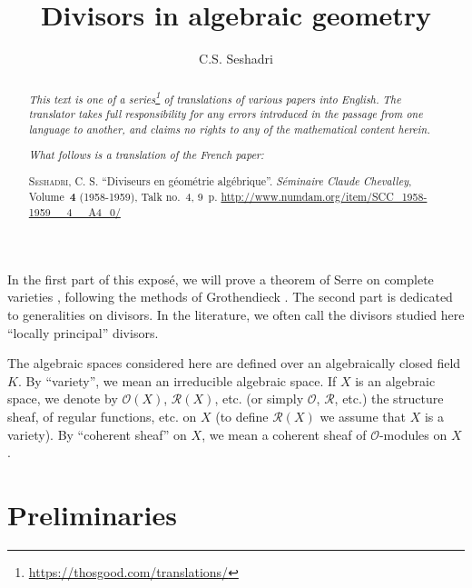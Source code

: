\documentclass{article}
\title{Divisors in algebraic geometry}
\author{C.S. Seshadri}
\date{}
\theoremstyle{plain}
\theoremstyle{definition}
\newcommand{\sh}{\mathscr}
\newcommand{\oldpage}[1]{\marginpar{\footnotesize$\Big\vert$ \textit{p.~#1}}}
\begin{document}
\maketitle
\thispagestyle{fancy}

\renewcommand{\abstractname}{Translator's note.}

\begin{abstract}
  \renewcommand*{\thefootnote}{\fnsymbol{footnote}}
  \emph{This text is one of a series\footnote{\url{https://thosgood.com/translations/}} of translations of various papers into English.}
  \emph{The translator takes full responsibility for any errors introduced in the passage from one language to another, and claims no rights to any of the mathematical content herein.}
  
  \emph{What follows is a translation of the French paper:}

  \medskip\noindent
  \textsc{Seshadri, C. S.}
  ``Diviseurs en g\'{e}om\'{e}trie alg\'{e}brique''.
  \emph{S\'{e}minaire Claude Chevalley}, Volume~\textbf{4} (1958-1959), Talk no.~4, 9~p.
  {\footnotesize\url{http://www.numdam.org/item/SCC_1958-1959__4__A4_0/}}
\end{abstract}

\setcounter{footnote}{0}

\tableofcontents
\bigskip



\oldpage{4-01}
In the first part of this expos\'{e}, we will prove a theorem of Serre on complete varieties \cite{6}, following the methods of Grothendieck \cite{4}.
The second part is dedicated to generalities on divisors.
In the literature, we often call the divisors studied here ``locally principal'' divisors.

The algebraic spaces considered here are defined over an algebraically closed field $K$.
By ``variety'', we mean an irreducible algebraic space.
If $X$ is an algebraic space, we denote by $\sh{O}(X)$, $\sh{R}(X)$, etc. (or simply $\sh{O}$, $\sh{R}$, etc.) the structure sheaf, of regular functions, etc. on $X$ (to define $\sh{R}(X)$ we assume that $X$ is a variety).
By ``coherent sheaf'' on $X$, we mean a coherent sheaf of $\sh{O}$-modules on $X$.


\section{Preliminaries}
\label{section1}

\cite{4,5,6}
\medskip
\end{document}
